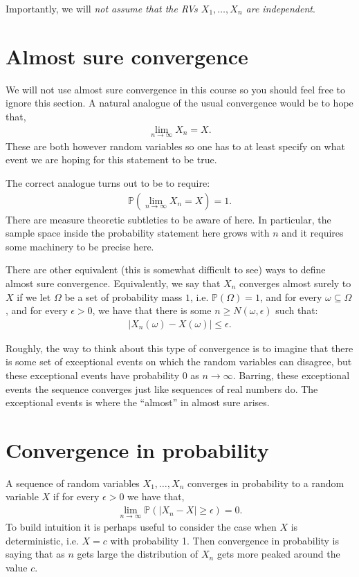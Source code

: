 \documentclass[twoside,12pt]{article}
\begin{document}
Importantly, we will \emph{not assume that the RVs $X_1,\ldots,X_n$ are independent}.

\section{Almost sure convergence}
We will not use almost sure convergence in this course so you should feel free to ignore this section.
A natural analogue of the usual convergence would be to hope that,
\begin{align*}
\lim_{n \rightarrow \infty} X_n = X.
\end{align*}
These are both however random variables so one has to at least specify on what event we are hoping for this statement to be true. 

The correct analogue turns out to be to require:
\begin{align*}
\mathbb{P}\left(\lim_{n \rightarrow \infty} X_n = X\right) = 1.
\end{align*}
There are measure theoretic subtleties to be aware of here. In particular, the sample space inside the probability statement here grows with $n$ and it requires some machinery to be precise here.


There are other equivalent (this is somewhat difficult to see) ways to define almost sure convergence.
Equivalently, we say that $X_n$ converges almost surely to $X$ if we let $\Omega$ be a set of probability mass $1$, i.e. $\mathbb{P}(\Omega) = 1$, and for every $\omega \subseteq \Omega$, and for every $\epsilon > 0$, we have that there is some $n \geq N(\omega,\epsilon)$ such that:
\begin{align*}
|X_n(\omega) - X(\omega)| \leq \epsilon.
\end{align*}

Roughly, the way to think about this type of convergence is to imagine that there is some set of exceptional events on which the random variables can disagree, but these exceptional events have probability $0$ as $n \rightarrow \infty$. Barring, these exceptional events the sequence converges just like sequences of real numbers do. The exceptional events is where the ``almost'' in almost sure arises.



\section{Convergence in probability}
A sequence of random variables $X_1,\ldots,X_n$ converges in probability to a random variable $X$ if for every $\epsilon > 0$ we have that,
\begin{align*}
\lim_{n \rightarrow \infty} \mathbb{P}( |X_n - X| \geq \epsilon) = 0.
\end{align*}
To build intuition it is perhaps useful to consider the case when $X$ is deterministic, i.e. $X = c$ with probability 1. Then convergence in probability is saying that as $n$ gets large the distribution of $X_n$ gets more peaked around the value $c$.
\end{document}
